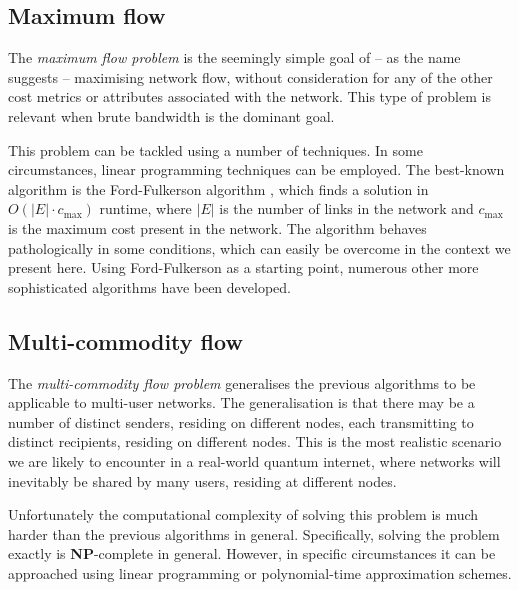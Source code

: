 \documentclass[aps,rmp,twocolumn,amsmath,amssymb,nofootinbib,superscriptaddress,longbibliography,floatfix,table-of-contents,eqsecnum]{revtex4-1}
\begin{document}
%
%

\subsection{Maximum flow} \label{sec:max_flow_prob} 

The \textit{maximum flow problem} \cite{???} is the seemingly simple goal of -- as the name suggests -- maximising network flow, without consideration for any of the other cost metrics or attributes associated with the network. This type of problem is relevant when brute bandwidth is the dominant goal.

This problem can be tackled using a number of techniques. In some circumstances, linear programming techniques can be employed. The best-known algorithm is the Ford-Fulkerson algorithm \cite{???}, which finds a solution in \mbox{$O(|E|\cdot c_\text{max})$} runtime, where $|E|$ is the number of links in the network and $c_\text{max}$ is the maximum cost present in the network. The algorithm behaves pathologically in some conditions, which can easily be overcome in the context we present here. Using Ford-Fulkerson as a starting point, numerous other more sophisticated algorithms have been developed.

%
%

\subsection{Multi-commodity flow} \label{sec:multi_comm_flow} 

The \textit{multi-commodity flow problem} \cite{???} generalises the previous algorithms to be applicable to multi-user networks. The generalisation is that there may be a number of distinct senders, residing on different nodes, each transmitting to distinct recipients, residing on different nodes. This is the most realistic scenario we are likely to encounter in a real-world quantum internet, where networks will inevitably be shared by many users, residing at different nodes.

Unfortunately the computational complexity of solving this problem is much harder than the previous algorithms in general. Specifically, solving the problem exactly is \textbf{NP}-complete in general. However, in specific circumstances it can be approached using linear programming or polynomial-time approximation schemes.
\end{document}
